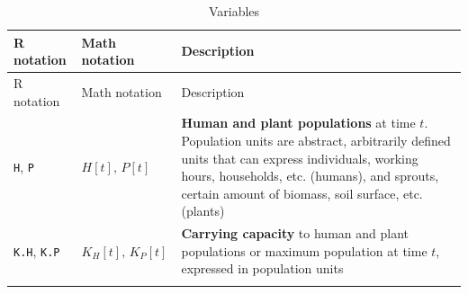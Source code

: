 \documentclass[]{book}
\begin{document}
\begin{longtable}[]{@{}lll@{}}
\caption{Variables}\tabularnewline
\toprule
\begin{minipage}[b]{0.36\columnwidth}\raggedright
R notation\strut
\end{minipage} & \begin{minipage}[b]{0.21\columnwidth}\raggedright
Math notation\strut
\end{minipage} & \begin{minipage}[b]{0.34\columnwidth}\raggedright
Description\strut
\end{minipage}\tabularnewline
\midrule
\endfirsthead
\toprule
\begin{minipage}[b]{0.36\columnwidth}\raggedright
R notation\strut
\end{minipage} & \begin{minipage}[b]{0.21\columnwidth}\raggedright
Math notation\strut
\end{minipage} & \begin{minipage}[b]{0.34\columnwidth}\raggedright
Description\strut
\end{minipage}\tabularnewline
\midrule
\endhead
\begin{minipage}[t]{0.36\columnwidth}\raggedright
\texttt{H}, \texttt{P}\strut
\end{minipage} & \begin{minipage}[t]{0.21\columnwidth}\raggedright
\(H[t],\,P[t]\)\strut
\end{minipage} & \begin{minipage}[t]{0.34\columnwidth}\raggedright
\textbf{Human and plant populations} at time \(t\). Population units are abstract, arbitrarily defined units that can express individuals, working hours, households, etc. (humans), and sprouts, certain amount of biomass, soil surface, etc. (plants)\strut
\end{minipage}\tabularnewline
\begin{minipage}[t]{0.36\columnwidth}\raggedright
\texttt{K.H}, \texttt{K.P}\strut
\end{minipage} & \begin{minipage}[t]{0.21\columnwidth}\raggedright
\(K_{H}[t],\,K_{P}[t]\)\strut
\end{minipage} & \begin{minipage}[t]{0.34\columnwidth}\raggedright
\textbf{Carrying capacity} to human and plant populations or maximum population at time \(t\), expressed in population units\strut
\end{minipage}\tabularnewline
\begin{minipage}[t]{0.36\columnwidth}\raggedright

\end{minipage}
\end{longtable}
\end{document}
